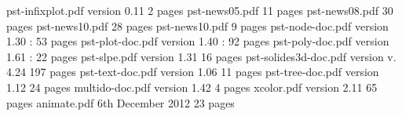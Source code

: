 \begin{thebibliography}{99}
 pst-infixplot.pdf  \hspace{1cm}	version 0.11 \hspace{1cm} 	2 pages 	\hspace{1cm}	\DGB
{} pst-news05.pdf 	 \hspace{1cm} 	11 pages 	\hspace{1cm}	\DGB
{} pst-news08.pdf 	\hspace{1cm} 	30 pages 	\hspace{1cm}	\DGB
{} pst-news10.pdf \hspace{1cm}	28 pages 	\hspace{1cm}	\DGB
{} pst-news10.pdf \hspace{1cm}	9 pages 	\hspace{1cm}	\DGB
{} pst-node-doc.pdf  \hspace{1cm}	version 1.30 :	53 pages 	\hspace{1cm}  	\DGB
{} pst-plot-doc.pdf  \hspace{1cm}	version 1.40 :	92 pages 	\hspace{1cm} 	\DGB
{} pst-poly-doc.pdf  \hspace{1cm}	version 1.61 :	22 pages 	\hspace{1cm} 	\DGB
{} pst-slpe.pdf   \hspace{1cm}	version 1.31 \hspace{1cm}	16 pages 	\hspace{1cm}  	\DGB
{} pst-solides3d-doc.pdf   \hspace{1cm}	version v. 4.24 \hspace{1cm}	197 pages 	\hspace{1cm}  	\DGB
{} pst-text-doc.pdf   \hspace{1cm}	version 1.06\hspace{1cm}	11 pages 	\hspace{1cm}  	\DGB
{} pst-tree-doc.pdf   \hspace{1cm}	version 1.12\hspace{1cm}	24 pages 	\hspace{1cm} 	\DGB
{} multido-doc.pdf   \hspace{1cm}	version 1.42\hspace{1cm}	4 pages 	\hspace{1cm}  	\DGB
{} xcolor.pdf   		\hspace{1cm}	version 2.11 \hspace{1cm}	65 pages 	\hspace{1cm}  	\DGB
{} animate.pdf   	\hspace{1cm}	6th December 2012 \hspace{1cm}	23 pages \hspace{1cm}  	\DGB
\end{thebibliography}